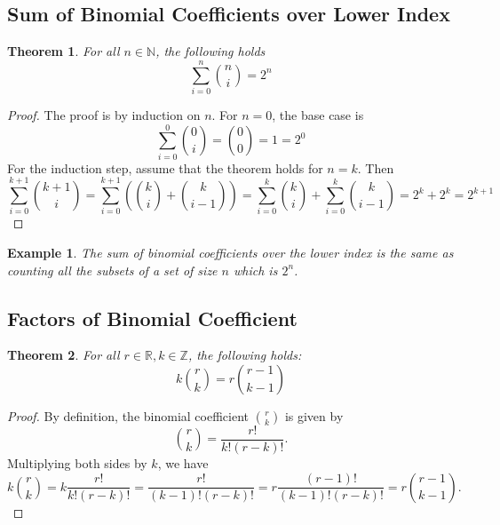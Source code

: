 \documentclass[11pt]{book} %
\newtheorem{theorem}{Theorem}[section]
\newtheorem*{example*}{Example}
\begin{document}
\subsection{Sum of Binomial Coefficients over Lower Index}

\begin{boxA}
    \begin{theorem}
        For all $n\in \mathbb{N}$, the following holds
        \begin{equation}
            \sum_{i=0}^{n} \binom{n}{i} = 2^n
        \end{equation}
    \end{theorem}
\end{boxA}

\begin{proof}
    The proof is by induction on $n$. For $n=0$, the base case is
    \begin{equation}
        \sum_{i=0}^{0} \binom{0}{i} = \binom{0}{0} = 1 = 2^0
    \end{equation}
    For the induction step, assume that the theorem holds for $n=k$. Then
    \begin{equation}
        \sum_{i=0}^{k+1} \binom{k+1}{i} = \sum_{i=0}^{k+1} \left( \binom{k}{i} + \binom{k}{i-1} \right) = \sum_{i=0}^{k} \binom{k}{i} + \sum_{i=0}^{k} \binom{k}{i-1} = 2^k + 2^k = 2^{k+1}
    \end{equation}
\end{proof}

\begin{example*}
    The sum of binomial coefficients over the lower index is the same as counting all the subsets of a set of size $n$ which is $2^n$.
\end{example*}


\subsection{Factors of Binomial Coefficient}

\begin{boxA}
    \begin{theorem}
        For all $r \in \mathbb{R}, k \in \mathbb{Z}$, the following holds:
        \begin{equation}
            k \binom{r}{k} = r \binom{r-1}{k-1}
        \end{equation}
    \end{theorem}
\end{boxA}

\begin{proof}
    By definition, the binomial coefficient $\binom{r}{k}$ is given by
    \begin{equation}
        \binom{r}{k} = \frac{r!}{k!(r-k)!}.
    \end{equation}
    Multiplying both sides by $k$, we have
    \begin{equation}
        k \binom{r}{k} = k \frac{r!}{k!(r-k)!} = \frac{r!}{(k-1)!(r-k)!} = r \frac{(r-1)!}{(k-1)!(r-k)!} = r \binom{r-1}{k-1}.
    \end{equation}
\end{proof}
\end{document}
